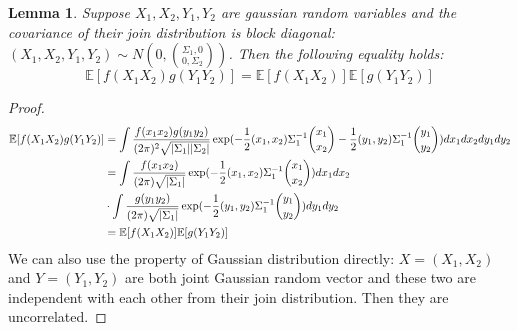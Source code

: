 \documentclass{article}
\DeclarePairedDelimiter\abs{\lvert}{\rvert}
\def\E{\mathbb{E}}
\newtheorem{lemma}{Lemma}
\begin{document}
\begin{lemma}\label{lem:abcd}
Suppose $X_1, X_2, Y_1, Y_2$ are gaussian random variables and
the covariance of their join distribution is block diagonal:
$(X_1, X_2, Y_1, Y_2) \sim N(0, \binom{\Sigma_1, 0}{0, \Sigma_2})$.
Then the following equality holds:
\begin{equation}
\E[f(X_1X_2)g(Y_1Y_2)] = \E[f(X_1 X_2)] \E[g(Y_1 Y_2)]
\end{equation}
\end{lemma}
\begin{proof}
\begin{align*}
\E[f(X_1X_2)g(Y_1Y_2)] & =
\int \frac{f(x_1 x_2) g(y_1 y_2)}
{(2\pi)^2 \sqrt{\abs{\Sigma_1}\abs{\Sigma_2}}}
\exp(-\frac{1}{2}(x_1, x_2) \Sigma_1^{-1} \binom{x_1}{x_2} -
\frac{1}{2}(y_1, y_2) \Sigma_1^{-1} \binom{y_1}{y_2})dx_1 d x_2 dy_1 dy_2 \\
& = \int \frac{f(x_1 x_2)  }{(2\pi) \sqrt{\abs{\Sigma_1}}}
\exp(-\frac{1}{2}(x_1, x_2) \Sigma_1^{-1} \binom{x_1}{x_2})dx_1 dx_2  \\
&\cdot \int \frac{g(y_1 y_2)}{(2\pi) \sqrt{\abs{\Sigma_1}}}
\exp(-\frac{1}{2}(y_1, y_2) \Sigma_1^{-1} \binom{y_1}{y_2})dy_1 dy_2 \\
& = \E[f(X_1 X_2)] \E[g(Y_1 Y_2)]
\end{align*}
We can also use the property of Gaussian distribution directly:
$X=(X_1, X_2)$ and $Y=(Y_1, Y_2)$
are both joint Gaussian random vector and
these two are independent with each other from their join distribution.
Then they are uncorrelated.
\end{proof}
\end{document}
